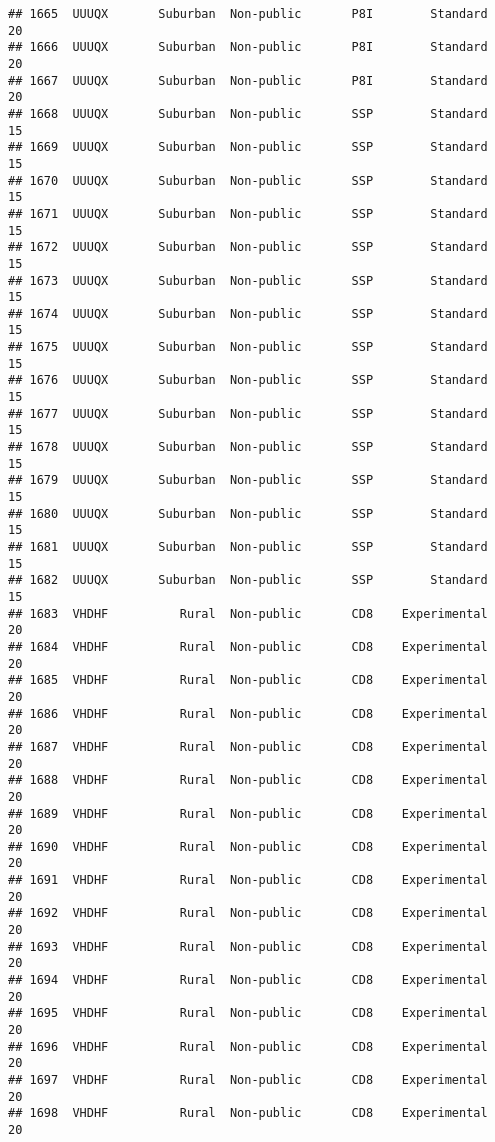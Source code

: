 \documentclass[
]{article}
\begin{document}
\begin{verbatim}
## 1665  UUUQX       Suburban  Non-public       P8I        Standard        20
## 1666  UUUQX       Suburban  Non-public       P8I        Standard        20
## 1667  UUUQX       Suburban  Non-public       P8I        Standard        20
## 1668  UUUQX       Suburban  Non-public       SSP        Standard        15
## 1669  UUUQX       Suburban  Non-public       SSP        Standard        15
## 1670  UUUQX       Suburban  Non-public       SSP        Standard        15
## 1671  UUUQX       Suburban  Non-public       SSP        Standard        15
## 1672  UUUQX       Suburban  Non-public       SSP        Standard        15
## 1673  UUUQX       Suburban  Non-public       SSP        Standard        15
## 1674  UUUQX       Suburban  Non-public       SSP        Standard        15
## 1675  UUUQX       Suburban  Non-public       SSP        Standard        15
## 1676  UUUQX       Suburban  Non-public       SSP        Standard        15
## 1677  UUUQX       Suburban  Non-public       SSP        Standard        15
## 1678  UUUQX       Suburban  Non-public       SSP        Standard        15
## 1679  UUUQX       Suburban  Non-public       SSP        Standard        15
## 1680  UUUQX       Suburban  Non-public       SSP        Standard        15
## 1681  UUUQX       Suburban  Non-public       SSP        Standard        15
## 1682  UUUQX       Suburban  Non-public       SSP        Standard        15
## 1683  VHDHF          Rural  Non-public       CD8    Experimental        20
## 1684  VHDHF          Rural  Non-public       CD8    Experimental        20
## 1685  VHDHF          Rural  Non-public       CD8    Experimental        20
## 1686  VHDHF          Rural  Non-public       CD8    Experimental        20
## 1687  VHDHF          Rural  Non-public       CD8    Experimental        20
## 1688  VHDHF          Rural  Non-public       CD8    Experimental        20
## 1689  VHDHF          Rural  Non-public       CD8    Experimental        20
## 1690  VHDHF          Rural  Non-public       CD8    Experimental        20
## 1691  VHDHF          Rural  Non-public       CD8    Experimental        20
## 1692  VHDHF          Rural  Non-public       CD8    Experimental        20
## 1693  VHDHF          Rural  Non-public       CD8    Experimental        20
## 1694  VHDHF          Rural  Non-public       CD8    Experimental        20
## 1695  VHDHF          Rural  Non-public       CD8    Experimental        20
## 1696  VHDHF          Rural  Non-public       CD8    Experimental        20
## 1697  VHDHF          Rural  Non-public       CD8    Experimental        20
## 1698  VHDHF          Rural  Non-public       CD8    Experimental        20

\end{verbatim}
\end{document}

